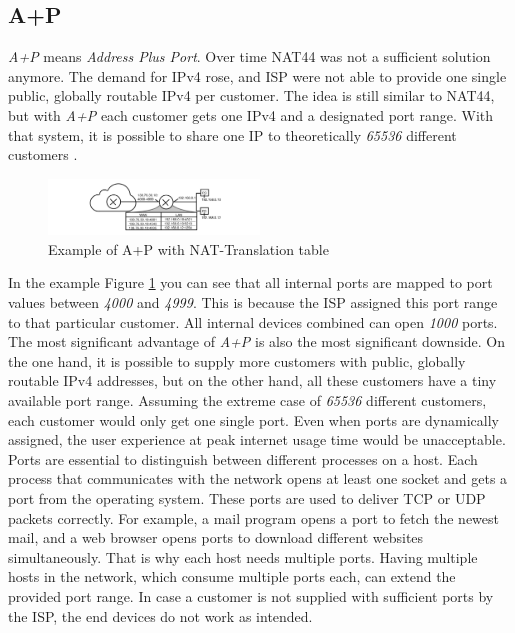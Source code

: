 \documentclass[format=sigconf, natbib=true, nonacm=true]{acmart}
\begin{document}
    \subsection{A+P}
    \textit{A+P} means \textit{Address Plus Port}. Over time NAT44 was not a sufficient solution anymore. The demand for IPv4 rose, and ISP were not able to provide one single public, globally routable IPv4 per customer. The idea is still similar to NAT44, but with \textit{A+P} each customer gets one IPv4 and a designated port range. With that system, it is possible to share one IP to theoretically \textit{65536} different customers \cite{8716482}.
    \begin{figure}
        \centering
        \includegraphics[width=0.5\textwidth]{images/a_plus_p.png}
        \caption{Example of A+P with NAT-Translation table}
        \label{fig:a_plus_p}
    \end{figure}
    In the example Figure \ref{fig:a_plus_p} you can see that all internal ports are mapped to port values between \textit{4000} and \textit{4999}. This is because the ISP assigned this port range to that particular customer. All internal devices combined can open \textit{1000} ports. The most significant advantage of \textit{A+P} is also the most significant downside. On the one hand, it is possible to supply more customers with public, globally routable IPv4 addresses, but on the other hand, all these customers have a tiny available port range. Assuming the extreme case of \textit{65536} different customers, each customer would only get one single port. Even when ports are dynamically assigned, the user experience at peak internet usage time would be unacceptable. Ports are essential to distinguish between different processes on a host. Each process that communicates with the network opens at least one socket and gets a port from the operating system. These ports are used to deliver TCP or UDP packets correctly. For example, a mail program opens a port to fetch the newest mail, and a web browser opens ports to download different websites simultaneously. That is why each host needs multiple ports. Having multiple hosts in the network, which consume multiple ports each, can extend the provided port range. In case a customer is not supplied with sufficient ports by the ISP, the end devices do not work as intended. 
\end{document}
